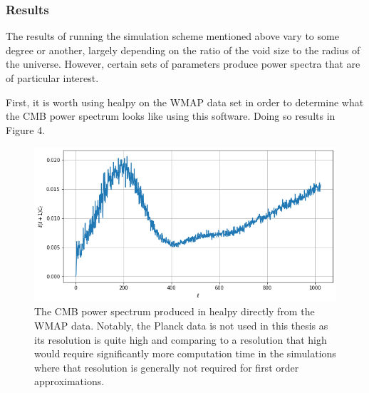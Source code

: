 \documentclass[a4paper]{article}
\begin{document}
    \subsubsection{Results}
    The results of running the simulation scheme mentioned above vary to some
    degree or another, largely depending on the ratio of the void size to the
    radius of the universe. However, certain sets of parameters produce power
    spectra that are of particular interest.

    First, it is worth using healpy on the WMAP data set in order to determine
    what the CMB power spectrum looks like using this software. Doing so
    results in Figure 4.

    \begin{figure}[h]
        \centering
        \includegraphics[width=\textwidth]{spectrum_real.png}
        \caption{The CMB power spectrum produced in healpy directly from the
            WMAP data. Notably, the Planck data is not used in this thesis as
            its resolution is quite high and comparing to a resolution that
            high would require significantly more computation time in the
            simulations where that resolution is generally not required for first
            order approximations.}
    \end{figure}
\end{document}
